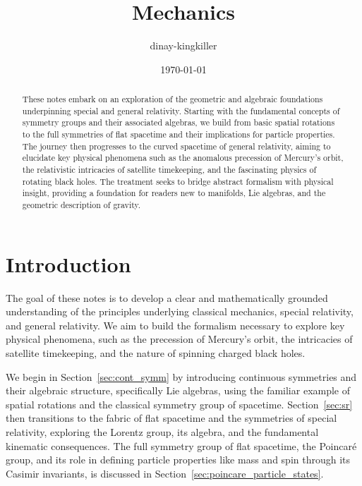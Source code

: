 \documentclass{amsart}
\theoremstyle{definition}
\theoremstyle{remark}
\begin{document}
\title{Mechanics}
\author{dinay-kingkiller}
\date{\today}

\begin{abstract}
  These notes embark on an exploration of the geometric and algebraic foundations underpinning special and general relativity. Starting with the fundamental concepts of symmetry groups and their associated algebras, we build from basic spatial rotations to the full symmetries of flat spacetime and their implications for particle properties. The journey then progresses to the curved spacetime of general relativity, aiming to elucidate key physical phenomena such as the anomalous precession of Mercury's orbit, the relativistic intricacies of satellite timekeeping, and the fascinating physics of rotating black holes. The treatment seeks to bridge abstract formalism with physical insight, providing a foundation for readers new to manifolds, Lie algebras, and the geometric description of gravity.
\end{abstract}

\maketitle

\section{Introduction}
\label{sec:intro}

The goal of these notes is to develop a clear and mathematically grounded understanding of the principles underlying classical mechanics, special relativity, and general relativity. We aim to build the formalism necessary to explore key physical phenomena, such as the precession of Mercury's orbit, the intricacies of satellite timekeeping, and the nature of spinning charged black holes.

We begin in Section~\ref{sec:cont_symm} by introducing continuous symmetries and their algebraic structure, specifically Lie algebras, using the familiar example of spatial rotations and the classical symmetry group of spacetime. Section~\ref{sec:sr} then transitions to the fabric of flat spacetime and the symmetries of special relativity, exploring the Lorentz group, its algebra, and the fundamental kinematic consequences. The full symmetry group of flat spacetime, the Poincaré group, and its role in defining particle properties like mass and spin through its Casimir invariants, is discussed in Section~\ref{sec:poincare_particle_states}.
\end{document}
